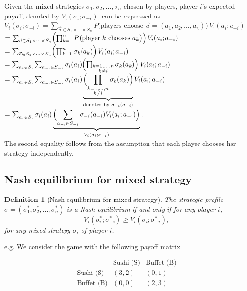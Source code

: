 \documentclass[twoside]{article}
\theoremstyle{definitionstyle}
\newtheorem*{definition}{Definition}
\begin{document}
Given the mixed strategies $\sigma_1, \sigma_2, \dots, \sigma_n$ chosen by players, player $i$'s expected payoff, denoted by $V_i(\sigma_i; \sigma_{-i})$, can be expressed as\\
$
V_i(\sigma_i; \sigma_{-i}) = \sum_{\vec{a} \in S_1 \times \dots \times S_n} P\bigl(\text{players choose } \vec{a} = (a_1, a_2, \dots, a_n)\bigr) \, V_i(a_i; a_{-i})
$\\
$= \sum_{\vec{a} \in S_1 \times \dots \times S_n} \Bigl( \prod_{k=1}^{n} P\bigl(\text{player } k \text{ chooses } a_k\bigr) \Bigr) \, V_i(a_i; a_{-i})$
$
= \sum_{\vec{a} \in S_1 \times \dots \times S_n} \Bigl( \prod_{k=1}^{n} \sigma_k(a_k) \Bigr) \, V_i(a_i; a_{-i})$\\
$
= \sum_{a_i \in S_i} \sum_{a_{-i} \in S_{-i}} \sigma_i(a_i) \Bigl( \prod_{\substack{k=1,\dots,n \\ k \neq i}} \sigma_k(a_k) \Bigr) \, V_i(a_i; a_{-i})
$
$
= \sum_{a_i \in S_i} \sum_{a_{-i} \in S_{-i}} \sigma_i(a_i) \underbrace{\Bigl( \prod_{\substack{k=1,\dots,n \\ k \neq i}} \sigma_k(a_k) \Bigr)}_{\text{denoted by } \sigma_{-i}(a_{-i})} V_i(a_i; a_{-i})
$
$
= \sum_{a_i \in S_i} \sigma_i(a_i) \underbrace{\Bigl( \sum_{a_{-i} \in S_{-i}} \sigma_{-i}(a_{-i}) V_i(a_i; a_{-i}) \Bigr)}_{V_i(a_i; \sigma_{-i})}.
$\\
The second equality follows from the assumption that each player chooses her strategy independently.



\subsection{Nash equilibrium for mixed strategy}
\begin{definition}[Nash equilibrium for mixed strategy]
   The strategic profile $\sigma = (\sigma_1^*, \sigma_2^*, \dots, \sigma_n^*)$ is a Nash equilibrium if and only if for any player $i$,
\[
V_i(\sigma_i^*; \sigma_{-i}^*) \ge V_i(\sigma_i; \sigma_{-i}^*),
\]
for any mixed strategy $\sigma_i$ of player $i$.
\end{definition}
e.g. We consider the game with the following payoff matrix:

\[
\begin{array}{c|cc}
& \text{Sushi (S)} & \text{Buffet (B)} \\
\hline
\text{Sushi (S)} & (3,2) & (0,1) \\
\text{Buffet (B)} & (0,0) & (2,3) \\
\end{array}
\]
\end{document}
